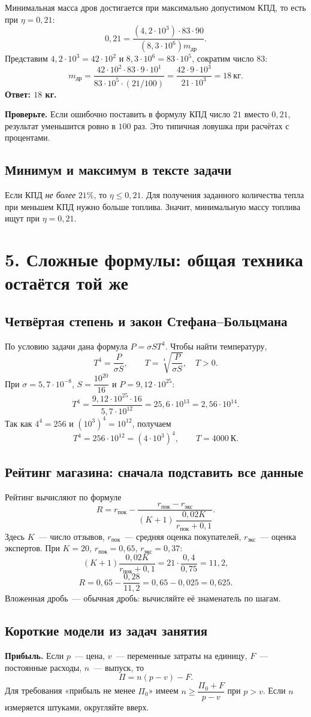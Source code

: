 \documentclass[a4paper,11pt]{article}
\newcommand{\topic}[1]{\section*{\textcolor{darkaccent}{#1}}}
\newcommand{\subtopic}[1]{\subsection*{\textcolor{accent}{#1}}}
\newcommand{\note}[1]{\textcolor{mute}{\textbf{Проверьте.}} #1}
\begin{document}
Минимальная масса дров достигается при максимально допустимом КПД, то есть при $\eta=0{,}21$:
\[
0{,}21=\frac{(4{,}2\cdot10^3)\cdot83\cdot90}
{(8{,}3\cdot10^6)m_{\text{др}}}.
\]
Представим $4{,}2\cdot10^3=42\cdot10^2$ и $8{,}3\cdot10^6=83\cdot10^5$, сократим число $83$:
\[
m_{\text{др}}
=\frac{42\cdot10^2\cdot83\cdot9\cdot10^1}{83\cdot10^5\cdot(21/100)}
=\frac{42\cdot9\cdot10^3}{21\cdot10^3}
=18\ \text{кг}.
\]
\textbf{Ответ: $18$ кг.}

\note{Если ошибочно поставить в формулу КПД число $21$ вместо $0{,}21$, результат уменьшится ровно в $100$ раз. Это типичная ловушка при расчётах с процентами.}

\subtopic{Минимум и максимум в тексте задачи}
Если КПД \emph{не более} $21\%$, то $\eta\le0{,}21$. Для получения заданного количества тепла при меньшем КПД нужно больше топлива. Значит, минимальную массу топлива ищут при $\eta=0{,}21$.

\clearpage
\topic{5. Сложные формулы: общая техника остаётся той же}

\subtopic{Четвёртая степень и закон Стефана--Больцмана}
По условию задачи дана формула $P=\sigma S T^4$. Чтобы найти температуру,
\[
T^4=\frac{P}{\sigma S},\qquad T=\sqrt[4]{\frac{P}{\sigma S}},\quad T>0.
\]
При $\sigma=5{,}7\cdot10^{-8}$, $S=\dfrac{10^{20}}{16}$ и $P=9{,}12\cdot10^{25}$:
\[
T^4=
\frac{9{,}12\cdot10^{25}\cdot16}{5{,}7\cdot10^{12}}
=25{,}6\cdot10^{13}
=2{,}56\cdot10^{14}.
\]
Так как $4^4=256$ и $(10^3)^4=10^{12}$, получаем
\[
T^4=256\cdot10^{12}=(4\cdot10^3)^4,
\qquad \boxed{T=4000\ \text{К}}.
\]

\subtopic{Рейтинг магазина: сначала подставить все данные}
Рейтинг вычисляют по формуле
\[
R=r_{\text{пок}}-
\frac{r_{\text{пок}}-r_{\text{экс}}}
{(K+1)\,\dfrac{0{,}02K}{r_{\text{пок}}+0{,}1}}.
\]
Здесь $K$~--- число отзывов, $r_{\text{пок}}$~--- средняя оценка покупателей, $r_{\text{экс}}$~--- оценка экспертов. При $K=20$, $r_{\text{пок}}=0{,}65$, $r_{\text{экс}}=0{,}37$:
\[
(K+1)\frac{0{,}02K}{r_{\text{пок}}+0{,}1}
=21\cdot\frac{0{,}4}{0{,}75}=11{,}2,
\]
\[
R=0{,}65-\frac{0{,}28}{11{,}2}
=0{,}65-0{,}025=\boxed{0{,}625}.
\]
Вложенная дробь~--- обычная дробь: вычисляйте её знаменатель по шагам.

\subtopic{Короткие модели из задач занятия}
\textbf{Прибыль.} Если $p$~--- цена, $v$~--- переменные затраты на единицу, $F$~--- постоянные расходы, $n$~--- выпуск, то
\[
\Pi=n(p-v)-F.
\]
Для требования «прибыль не менее $\Pi_0$» имеем $n\ge\dfrac{\Pi_0+F}{p-v}$ при $p>v$. Если $n$ измеряется штуками, округляйте вверх.
\end{document}
